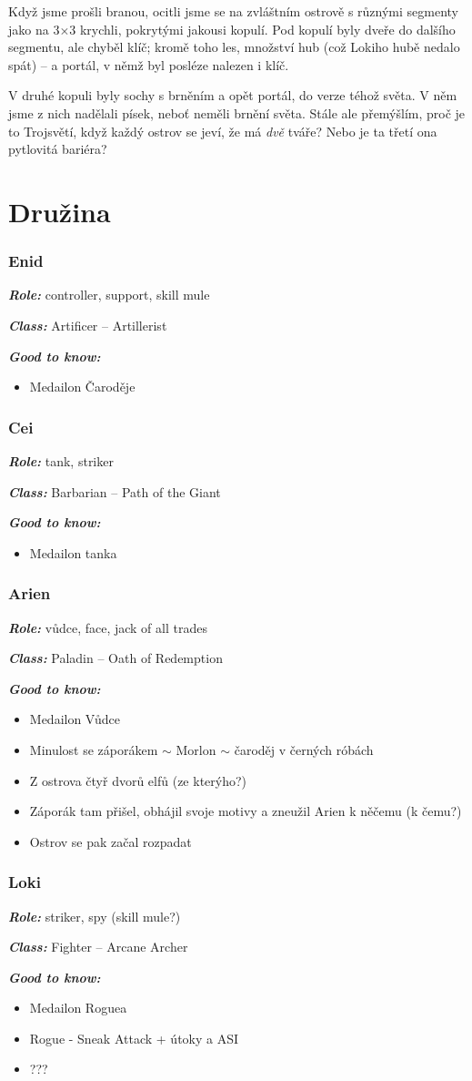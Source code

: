 \documentclass[a4paper,twocolumn,openany,nodeprecatedcode, justified]{dndbook}
\newcommand{\bi}{\begin{itemize}}
\newcommand{\ei}{\end{itemize}}
\newcommand{\titulek}[1]{\par \noindent \textbf{\emph{#1:}}}
\begin{document}
	Když jsme prošli branou, ocitli jsme se na zvláštním ostrově s různými segmenty jako na 3$\times$3 krychli, pokrytými jakousi kopulí. Pod kopulí byly dveře do dalšího segmentu, ale chyběl klíč; kromě toho les, množství hub (což Lokiho hubě nedalo spát) -- a portál, v němž byl posléze nalezen i klíč.	
	
	V druhé kopuli byly sochy s brněním a opět portál, do  verze téhož světa. V něm jsme z nich nadělali písek, neboť neměli brnění  světa. Stále ale přemýšlím, proč je to Trojsvětí, když každý ostrov se jeví, že má \emph{dvě} tváře? Nebo je ta třetí ona pytlovitá bariéra?
			
	
	\part{Družina}

	
	
	\section{Enid}
	\titulek{Role} controller, support, skill mule
	\titulek{Class} Artificer -- Artillerist
	\titulek{Good to know}
	\bi
	\item Medailon Čaroděje
	\ei
	
	\section{Cei}
	\titulek{Role} tank, striker
	\titulek{Class} Barbarian -- Path of the Giant
	\titulek{Good to know} \bi
	\item Medailon tanka
	\ei
	
	\section{Arien}
	\titulek{Role} vůdce, face, jack of all trades
	\titulek{Class} Paladin -- Oath of Redemption
	\titulek{Good to know} \bi
	\item Medailon Vůdce
	\item Minulost se záporákem $\sim$ Morlon $\sim$ čaroděj v černých róbách
	\item Z ostrova čtyř dvorů elfů (ze kterýho?)
	\item Záporák tam přišel, obhájil svoje motivy a zneužil Arien k něčemu (k čemu?)
	\item Ostrov se pak začal rozpadat
	\ei
	
	\section{Loki}
	\titulek{Role} striker, spy (skill mule?)
	\titulek{Class} Fighter -- Arcane Archer
	\titulek{Good to know}
	\bi
	\item Medailon Roguea
	\item Rogue - Sneak Attack + útoky a ASI
	\item ???
	\ei
	
\end{document}
